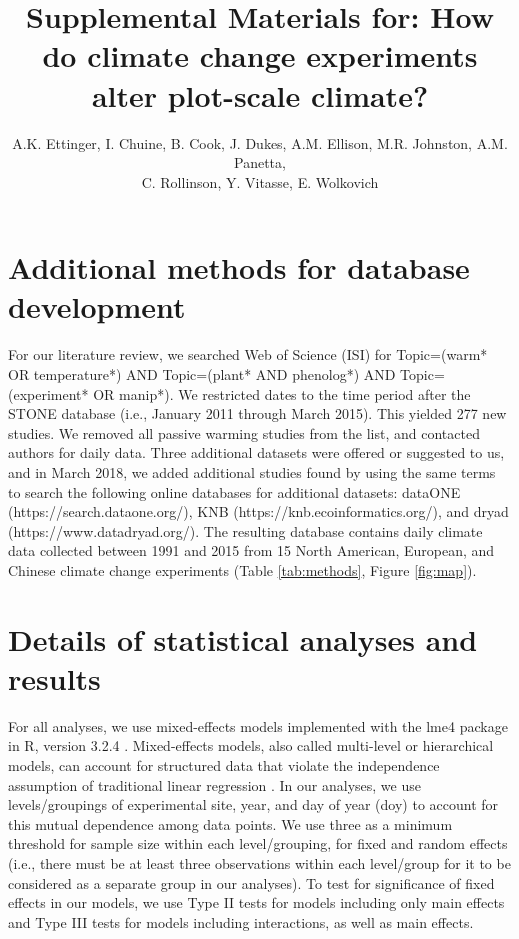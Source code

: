 \documentclass{article}
\begin{document}

\title{Supplemental Materials for: How do climate change experiments alter plot-scale climate?} 

\author{A.K. Ettinger, I. Chuine, B. Cook, J. Dukes, A.M. Ellison, M.R. Johnston, A.M. Panetta,\\ C. Rollinson, Y. Vitasse, E. Wolkovich}
\maketitle  %
\renewcommand{\thetable}{S\arabic{table}}
\renewcommand{\thefigure}{S\arabic{figure}}

\section* {Additional methods for database development}
For our literature review, we searched Web of Science (ISI) for Topic=(warm* OR temperature*) AND Topic=(plant* AND phenolog*) AND Topic=(experiment* OR manip*). We restricted dates to the time period after the STONE database (i.e., January 2011 through March 2015). This yielded 277 new studies. We removed all passive warming studies from the list, and contacted authors for daily data. Three additional datasets were offered or suggested to us, and in March 2018, we added additional studies found by using the same terms to search the following online databases for additional datasets: dataONE (https://search.dataone.org/), KNB (https://knb.ecoinformatics.org/), and dryad (https://www.datadryad.org/). The resulting database contains daily climate data collected between 1991 and 2015 from 15 North American, European, and Chinese climate change experiments (Table \ref{tab:methods}, Figure \ref{fig:map}). %

\section* {Details of statistical analyses and results}
For all analyses, we use mixed-effects models implemented with the lme4 package in R, version 3.2.4 \citep{bates2015,rcoreteam2017}. Mixed-effects models, also called multi-level or hierarchical models, can account for structured data that violate the independence assumption of traditional linear regression \citep{gelman2007}. In our analyses, we use levels/groupings of experimental site, year, and day of year (doy) to account for this mutual dependence among data points. We use three as a minimum threshold for sample size within each level/grouping, for fixed and random effects (i.e., there must be at least three observations within each level/group for it to be considered as a separate group in our analyses). To test for significance of fixed effects in our models, we use Type II tests for models including only main effects and Type III tests for models including interactions, as well as main effects. 
\end{document}
